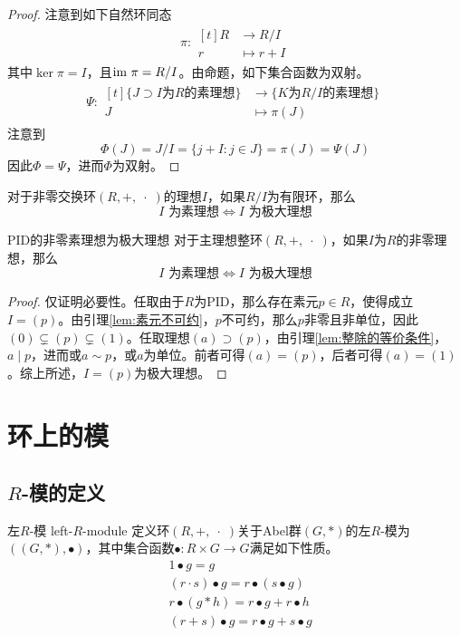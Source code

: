 \begin{proof}
	注意到如下自然环同态
	\begin{align*}
		\pi:\begin{aligned}[t]
			R&\longrightarrow R/I\\
			r&\longmapsto r+I
		\end{aligned}
	\end{align*}
	其中$\ker\pi=I$，且$\text{im } \pi=R/I$。由命题，如下集合函数为双射。
	\begin{align*}
		\Psi:\begin{aligned}[t]
			\{ J\supset I\text{为}R\text{的素理想} \}&\longrightarrow \{ K\text{为}R/I\text{的素理想} \}\\
			J&\longmapsto \pi(J)
		\end{aligned}
	\end{align*}
	注意到
	$$
	\Phi(J)=J/I=\{ j+I:j\in J \}=\pi(J)=\Psi(J)
	$$
	因此$\Phi=\Psi$，进而$\Phi$为双射。
\end{proof}

\begin{proposition}
	对于非零交换环$(R,+,\;\cdot\;)$的理想$I$，如果$R/I$为有限环，那么
	$$
	I \text{ 为素理想}
	\iff
	I \text{ 为极大理想}
	$$
\end{proposition}

\begin{proposition}{}{PID的非零素理想为极大理想}
	对于主理想整环$(R,+,\;\cdot\;)$，如果$I$为$R$的非零理想，那么
	$$
	I \text{ 为素理想}
	\iff
	I \text{ 为极大理想}
	$$
\end{proposition}

\begin{proof}
	仅证明必要性。任取由于$R$为PID，那么存在素元$p\in R$，使得成立$I=(p)$。由引理\ref{lem:素元不可约}，$p$不可约，那么$p$非零且非单位，因此$(0)\subsetneq (p) \subsetneq (1)$。任取理想$(a)\supset (p)$，由引理\ref{lem:整除的等价条件}，$a\mid p$，进而或$a\sim p$，或$a$为单位。前者可得$(a)=(p)$，后者可得$(a)=(1)$。综上所述，$I=(p)$为极大理想。
\end{proof}

\section{环上的模}

\subsection{$R$-模的定义}

\begin{definition}{左$R$-模 left-$R$-module}
	定义环$(R,+,\;\cdot\;)$关于Abel群$(G,*)$的左$R$-模为$((G,*),\bullet)$，其中集合函数$\bullet:R\times G\to G$满足如下性质。
	\begin{align*}
		&1\bullet g=g\\
		&(r\cdot s)\bullet g=r\bullet(s\bullet g)\\
		&r\bullet(g*h)=r\bullet g+r\bullet h\\
		&(r+s)\bullet g=r\bullet g+s\bullet g
	\end{align*}
\end{definition}

